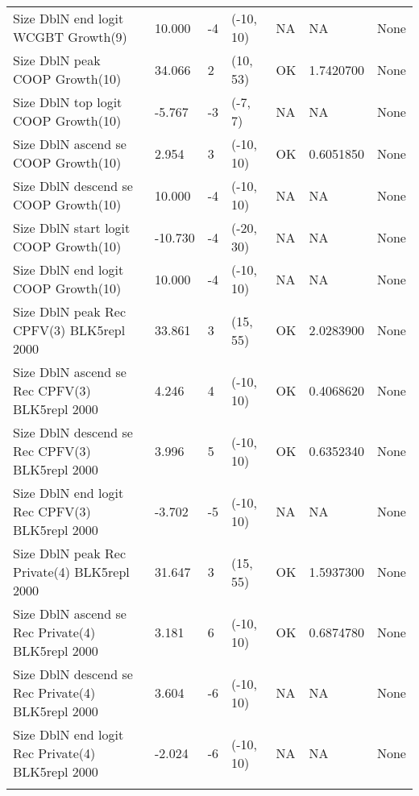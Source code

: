 \documentclass[11pt,
  english,
  letterpaper,
]{article}
\begin{document}
\begin{landscape}
\begin{longtable}[t]{>{\raggedright\arraybackslash}p{7cm}lllll>{\raggedright\arraybackslash}p{4cm}}
Size DblN end logit WCGBT Growth(9) & 10.000 & -4 & (-10, 10) & NA & NA & None\\
Size DblN peak COOP Growth(10) & 34.066 & 2 & (10, 53) & OK & 1.7420700 & None\\
Size DblN top logit COOP Growth(10) & -5.767 & -3 & (-7, 7) & NA & NA & None\\
Size DblN ascend se COOP Growth(10) & 2.954 & 3 & (-10, 10) & OK & 0.6051850 & None\\
Size DblN descend se COOP Growth(10) & 10.000 & -4 & (-10, 10) & NA & NA & None\\
Size DblN start logit COOP Growth(10) & -10.730 & -4 & (-20, 30) & NA & NA & None\\
Size DblN end logit COOP Growth(10) & 10.000 & -4 & (-10, 10) & NA & NA & None\\
Size DblN peak Rec CPFV(3) BLK5repl 2000 & 33.861 & 3 & (15, 55) & OK & 2.0283900 & None\\
Size DblN ascend se Rec CPFV(3) BLK5repl 2000 & 4.246 & 4 & (-10, 10) & OK & 0.4068620 & None\\
Size DblN descend se Rec CPFV(3) BLK5repl 2000 & 3.996 & 5 & (-10, 10) & OK & 0.6352340 & None\\
Size DblN end logit Rec CPFV(3) BLK5repl 2000 & -3.702 & -5 & (-10, 10) & NA & NA & None\\
Size DblN peak Rec Private(4) BLK5repl 2000 & 31.647 & 3 & (15, 55) & OK & 1.5937300 & None\\
Size DblN ascend se Rec Private(4) BLK5repl 2000 & 3.181 & 6 & (-10, 10) & OK & 0.6874780 & None\\
Size DblN descend se Rec Private(4) BLK5repl 2000 & 3.604 & -6 & (-10, 10) & NA & NA & None\\
Size DblN end logit Rec Private(4) BLK5repl 2000 & -2.024 & -6 & (-10, 10) & NA & NA & None\\*
\end{longtable}
\endgroup{}
\end{landscape}
\endgroup{}

\newpage



\newpage

\begingroup\fontsize{10}{12}\selectfont
\begingroup\fontsize{10}{12}\selectfont
\end{document}
